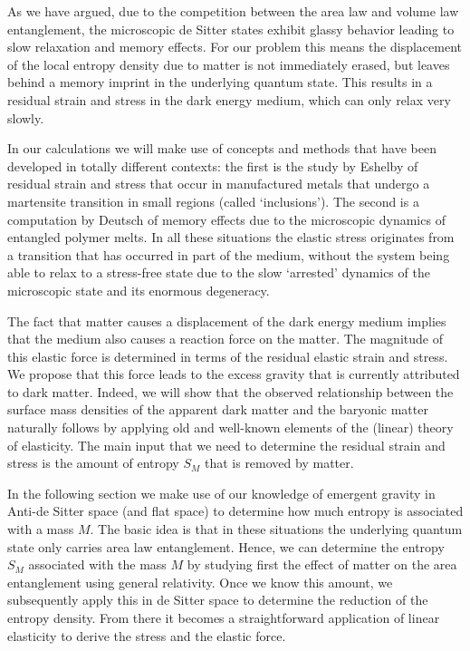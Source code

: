 \documentclass[a4paper,12pt]{article}
\begin{document}
 As we have argued, due to the competition between the area law and volume law entanglement, the microscopic de Sitter states exhibit glassy behavior leading to slow relaxation and memory effects.  For our problem this means the displacement of the local entropy density due to matter is not immediately erased, but leaves behind a memory imprint in the underlying quantum state.  This results in a residual strain and stress in the dark energy medium, which can only relax very slowly.  


In our calculations we will make use of concepts and methods that have been developed in totally different contexts: the first is the study   by Eshelby \cite{Eshelby} of
residual strain and stress that occur in manufactured metals that undergo a martensite transition in small regions (called `inclusions'). The second is a computation by  Deutsch \cite{Deutsch} of memory effects due to the microscopic dynamics of entangled polymer melts.  In all these situations the elastic stress originates from a transition that has occurred in  part of the medium, without the system    being able to relax to a stress-free state due to the slow `arrested' dynamics of the microscopic state and its enormous degeneracy. 

The fact that matter causes a  displacement of the dark energy medium implies that the medium also causes a reaction force on the matter.  The magnitude of this elastic force is determined in terms of the residual elastic strain and stress. We propose that this  force leads to  the excess gravity that is currently attributed to dark matter. 
Indeed, we will show that the observed relationship between the surface mass densities of the apparent dark matter and the baryonic matter naturally follows by applying old and well-known elements of the (linear) theory of elasticity.  The main input that we need to determine the residual strain and stress is the amount of entropy $S_M$ that is removed by matter. 

In the following section we make use of our knowledge of emergent gravity in Anti-de Sitter space (and flat space) to determine how much entropy is associated with a mass $M$.  The basic idea is that in these situations the underlying quantum state only carries   area law entanglement.  Hence, we can determine the entropy $S_M$ associated with the mass $M$ by studying first the effect of matter on the area entanglement using general relativity. Once we know this amount, we subsequently apply this in de Sitter space to determine the reduction of the entropy density.  From there it becomes a straightforward application of linear elasticity to derive the stress and the elastic force. 
\end{document}
